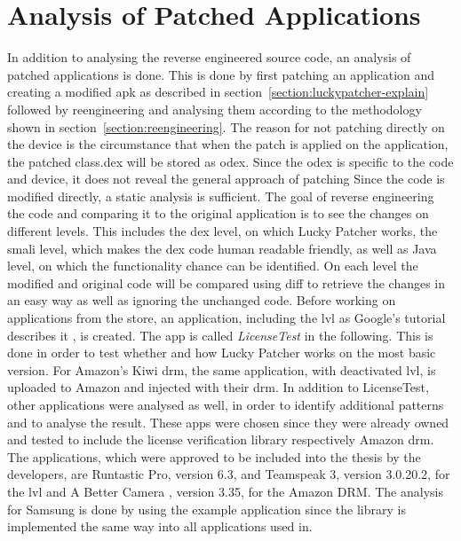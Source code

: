 \section{Analysis of Patched Applications} \label{section:luckypatcher-operation}
In addition to analysing the reverse engineered source code, an analysis of patched applications is done.
This is done by first patching an application and creating a modified apk as described in section~\ref{section:luckypatcher-explain} followed by reengineering and analysing them according to the methodology shown in section~\ref{section:reengineering}.
The reason for not patching directly on the device is the circumstance that when the patch is applied on the application, the patched class.dex will be stored as odex.
Since the odex is specific to the code and device, it does not reveal the general approach of patching
Since the code is modified directly, a static analysis is sufficient.
\newline
The goal of reverse engineering the code and comparing it to the original application is to see the changes on different levels.
This includes the \gls{dex} level, on which Lucky Patcher works, the smali level, which makes the \gls{dex} code human readable friendly, as well as Java level, on which the functionality chance can be identified.
On each level the modified and original code will be compared using diff to retrieve the changes in an easy way as well as ignoring the unchanged code.
\newline
Before working on applications from the store, an application, including the \gls{lvl} as Google's tutorial describes it \cite{developersLicensingAdding}, is created.
The app is called \textit{LicenseTest} in the following.
This is done in order to test whether and how Lucky Patcher works on the most basic version.
For Amazon's Kiwi \gls{drm}, the same application, with deactivated \gls{lvl}, is uploaded to Amazon and injected with their \gls{drm}.
In addition to LicenseTest, other applications were analysed as well, in order to identify additional patterns and to analyse the result.
These apps were chosen since they were already owned and tested to include the license verification library respectively Amazon \gls{drm}.
The applications, which were approved to be included into the thesis by the developers, are Runtastic Pro\cite{runtasticApp}, version 6.3, and Teamspeak 3\cite{teamspeakApp}, version 3.0.20.2, for the \gls{lvl} and A Better Camera \cite{abettercamera}, version 3.35, for the Amazon DRM.
The analysis for Samsung is done by using the example application since the library is implemented the same way into all applications used in.
